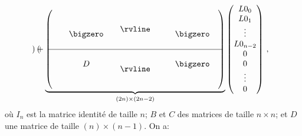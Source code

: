 \begin{align}
\begin{pmatrix}
        \end{pmatrix}
    +
    \underbrace{\begin{pmatrix}
        \begin{matrix}
       & & &  \\ & & &  \\ & & \bigzero & \\ & & & \\      
        \end{matrix}
        & \rvline 
        &     \begin{matrix}
            & & &  \\ & & &  \\ & & \bigzero & \\ & & & \\      
             \end{matrix}  \\ 
        \hline
        \begin{matrix}
            & & &  \\ & & D & \\ & & & \\ & & & \\     
        \end{matrix}
        & \rvline 
        &   \begin{matrix}
            & & &  \\ & & \bigzero &  \\ & &  & \\ & & & \\      
            \end{matrix}
      \end{pmatrix}}_{(2n) \times (2n-2)}
      \begin{pmatrix}
        L0_0 \\ L0_1 \\ \vdots \\ L0_{n-2} \\ 0 \\ 0 \\ \vdots \\ 0
        \end{pmatrix} \,,
\end{align}
où $I_n$ est la matrice identité de taille $n$; $B$ et $C$ des matrices de taille $n\times n$; et $D$ une matrice de taille $(n) \times (n-1)$. On a:
